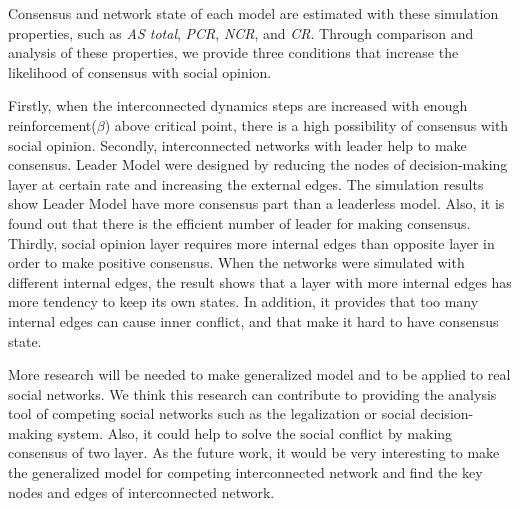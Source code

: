 \documentclass[english]{cccconf}
\begin{document}
Consensus and network state of each model are estimated with these simulation properties, such as \textit{AS total}, \textit{PCR}, \textit{NCR}, and \textit{CR}. Through comparison and analysis of these properties, we provide three conditions that increase the likelihood of consensus with social opinion.

Firstly, when the interconnected dynamics steps are increased with enough reinforcement($\beta$) above critical point, there is a high possibility of consensus with social opinion. Secondly, interconnected networks with leader help to make consensus. Leader Model were designed by reducing the nodes of decision-making layer at certain rate and increasing the external edges. The simulation results show  Leader Model have more consensus part than a leaderless model. Also, it is found out that there is the efficient number of leader for making consensus. Thirdly, social opinion layer requires more internal edges than opposite layer in order to make positive consensus. When the networks were simulated with different internal edges, the result shows that a layer with more internal edges has more tendency to keep its own states. In addition, it provides that too many internal edges can cause inner conflict, and that make it hard to have consensus state.  

More research will be needed to make generalized model and to be applied to real social networks. We think this research can contribute to providing the analysis tool of competing social networks such as the legalization or social decision-making system. Also, it could help to solve the social conflict by making consensus of two layer. As the future work, it would be very interesting to make the generalized model for competing interconnected network and find the key nodes and edges of interconnected network.
\end{document}
